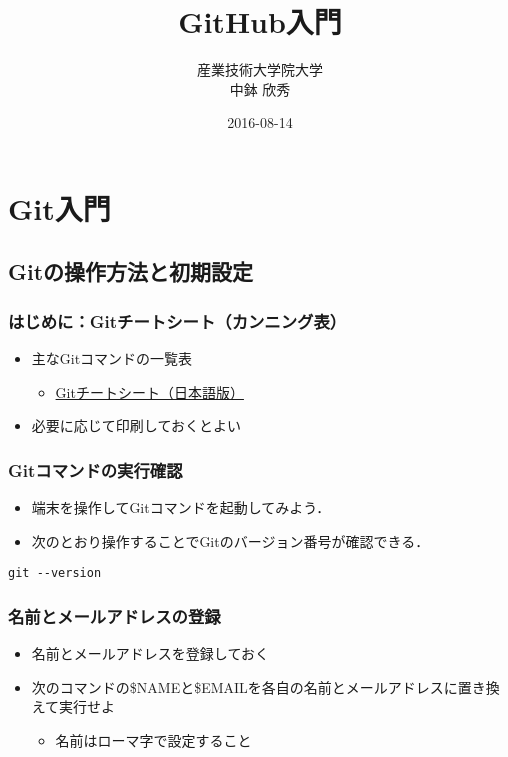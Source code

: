 \documentclass[a4paper,twoside,twocolumn]{bxjsarticle}
\author{産業技術大学院大学\\ 中鉢 欣秀}
\date{2016-08-14}
\title{GitHub入門}
\begin{document}
\maketitle

\section{Git入門}
\label{sec-1}
\subsection{Gitの操作方法と初期設定}
\label{sec-1-1}
\subsubsection{はじめに：Gitチートシート（カンニング表）}
\label{sec-1-1-1}
\begin{itemize}
\item 主なGitコマンドの一覧表
\begin{itemize}
\item \href{https://services.github.com/kit/downloads/ja/github-git-cheat-sheet.pdf}{Gitチートシート（日本語版）}
\end{itemize}
\item 必要に応じて印刷しておくとよい
\end{itemize}

\subsubsection{Gitコマンドの実行確認}
\label{sec-1-1-2}
\begin{itemize}
\item 端末を操作してGitコマンドを起動してみよう．
\item 次のとおり操作することでGitのバージョン番号が確認できる．
\end{itemize}

\begin{verbatim}
git --version
\end{verbatim}

\subsubsection{名前とメールアドレスの登録}
\label{sec-1-1-3}
\begin{itemize}
\item 名前とメールアドレスを登録しておく
\item 次のコマンドの\$NAMEと\$EMAILを各自の名前とメールアドレスに置き換えて実行せよ
\begin{itemize}
\item 名前はローマ字で設定すること
\end{itemize}
\end{itemize}
\end{document}
